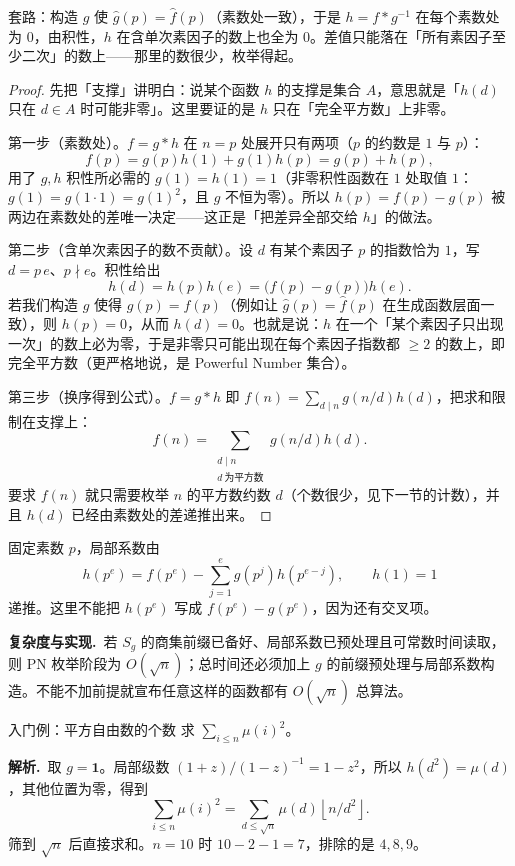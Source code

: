 \documentclass[UTF8,a4paper,11pt,oneside,openany,fontset=fandol]{ctexbook}
\theoremstyle{definition}
\newcommand{\one}{\mathbf 1}
\newcommand{\floor}[1]{\left\lfloor #1\right\rfloor}
\newcommand{\sol}{\par\noindent\textbf{解析.}\ }
\newcommand{\cost}{\par\noindent\textbf{复杂度与实现.}\ }
\begin{document}
\begin{tip}
套路：构造 $g$ 使 $\hat g(p)=\hat f(p)$（素数处一致），于是 $h=f*g^{-1}$ 在每个素数处为 $0$，由积性，$h$ 在含单次素因子的数上也全为 $0$。差值只能落在「所有素因子至少二次」的数上——那里的数很少，枚举得起。
\end{tip}


\begin{proof}
先把「支撑」讲明白：说某个函数 $h$ 的支撑是集合 $A$，意思就是「$h(d)$ 只在 $d\in A$ 时可能非零」。这里要证的是 $h$ 只在「完全平方数」上非零。

第一步（素数处）。$f=g*h$ 在 $n=p$ 处展开只有两项（$p$ 的约数是 $1$ 与 $p$）：
\[
 f(p)=g(p)h(1)+g(1)h(p)=g(p)+h(p),
\]
用了 $g,h$ 积性所必需的 $g(1)=h(1)=1$（非零积性函数在 $1$ 处取值 $1$：$g(1)=g(1\cdot1)=g(1)^2$，且 $g$ 不恒为零）。所以 $h(p)=f(p)-g(p)$ 被两边在素数处的差唯一决定——这正是「把差异全部交给 $h$」的做法。

第二步（含单次素因子的数不贡献）。设 $d$ 有某个素因子 $p$ 的指数恰为 $1$，写 $d=p\,e$、$p\nmid e$。积性给出
\[
 h(d)=h(p)h(e)=\big(f(p)-g(p)\big)h(e).
\]
若我们构造 $g$ 使得 $g(p)=f(p)$（例如让 $\hat g(p)=\hat f(p)$ 在生成函数层面一致），则 $h(p)=0$，从而 $h(d)=0$。也就是说：$h$ 在一个「某个素因子只出现一次」的数上必为零，于是非零只可能出现在每个素因子指数都 $\ge2$ 的数上，即完全平方数（更严格地说，是 Powerful Number 集合）。

第三步（换序得到公式）。$f=g*h$ 即 $f(n)=\sum_{d\mid n}g(n/d)h(d)$，把求和限制在支撑上：
\[
 f(n)=\sum_{\substack{d\mid n\\ d\ \text{为平方数}}} g(n/d)h(d).
\]
要求 $f(n)$ 就只需要枚举 $n$ 的平方数约数 $d$（个数很少，见下一节的计数），并且 $h(d)$ 已经由素数处的差递推出来。
\end{proof}
固定素数 $p$，局部系数由
\[
 h(p^e)=f(p^e)-\sum_{j=1}^e g(p^j)h(p^{e-j}),\qquad h(1)=1
\]
递推。这里不能把 $h(p^e)$ 写成 $f(p^e)-g(p^e)$，因为还有交叉项。
\cost 若 $S_g$ 的商集前缀已备好、局部系数已预处理且可常数时间读取，则 PN 枚举阶段为 $O(\sqrt n)$；总时间还必须加上 $g$ 的前缀预处理与局部系数构造。不能不加前提就宣布任意这样的函数都有 $O(\sqrt n)$ 总算法。

\begin{problem}{入门例：平方自由数的个数}
求 $\sum_{i\le n}\mu(i)^2$。
\end{problem}
\sol 取 $g=\one$。局部级数 $(1+z)/(1-z)^{-1}=1-z^2$，所以 $h(d^2)=\mu(d)$，其他位置为零，得到
\[
 \sum_{i\le n}\mu(i)^2=\sum_{d\le\sqrt n}\mu(d)\floor{n/d^2}.
\]
筛到 $\sqrt n$ 后直接求和。$n=10$ 时 $10-2-1=7$，排除的是 $4,8,9$。
\end{document}
